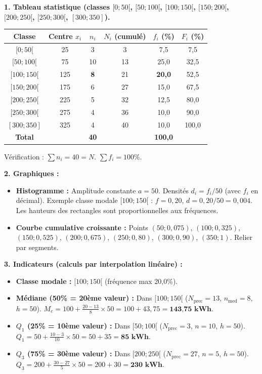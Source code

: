 \documentclass[11pt]{article}
\begin{document}
\begin{corrige}
\textbf{1. Tableau statistique (classes $[0;50[$, $[50;100[$, $[100;150[$, $[150;200[$, $[200;250[$, $[250;300[$, $[300;350]$).}
\begin{center}
\begin{tabular}{|c|c|c|c|c|c|}\hline
Classe & Centre $x_i$ & $n_i$ & $N_i$ (cumulé) & $f_i$ (\%) & $F_i$ (\%) \\ \hline
$[0 ; 50[$ & 25 & 3 & 3 & 7,5 & 7,5 \\
$[50 ; 100[$ & 75 & 10 & 13 & 25,0 & 32,5 \\
$[100 ; 150[$ & 125 & \textbf{8} & 21 & \textbf{20,0} & 52,5 \\
$[150 ; 200[$ & 175 & 6 & 27 & 15,0 & 67,5 \\
$[200 ; 250[$ & 225 & 5 & 32 & 12,5 & 80,0 \\
$[250 ; 300[$ & 275 & 4 & 36 & 10,0 & 90,0 \\
$[300 ; 350]$ & 325 & 4 & 40 & 10,0 & 100,0 \\ \hline
\textbf{Total} & & \textbf{40} & & \textbf{100,0} & \\ \hline
\end{tabular}
\end{center}
Vérification : $\sum n_i = 40 = N$. $\sum f_i = 100\%$.

\textbf{2. Graphiques :} 
\begin{itemize}
    \item \textbf{Histogramme :} Amplitude constante $a=50$. Densités $d_i = f_i / 50$ (avec $f_i$ en décimal). Exemple classe modale $[100;150[$ : $f=0,20$, $d = 0,20 / 50 = 0,004$. Les hauteurs des rectangles sont proportionnelles aux fréquences.
    \item \textbf{Courbe cumulative croissante :} Points $(50;0,075)$, $(100;0,325)$, $(150;0,525)$, $(200;0,675)$, $(250;0,80)$, $(300;0,90)$, $(350;1)$. Relier par segments.
\end{itemize}

\textbf{3. Indicateurs (calculs par interpolation linéaire) :}
\begin{itemize}
    \item \textbf{Classe modale :} $[100 ; 150[$ (fréquence max 20,0\%).
    \item \textbf{Médiane (50\% = 20ème valeur) :} Dans $[100 ; 150[$ ($N_{\text{prec}}=13$, $n_{\text{med}}=8$, $h=50$).
    $M_e = 100 + \frac{20 - 13}{8} \times 50 = 100 + 43,75 = \textbf{143,75 kWh}$.
    \item \textbf{$Q_1$ (25\% = 10ème valeur) :} Dans $[50 ; 100[$ ($N_{\text{prec}}=3$, $n=10$, $h=50$).
    $Q_1 = 50 + \frac{10 - 3}{10} \times 50 = 50 + 35 = \textbf{85 kWh}$.
    \item \textbf{$Q_3$ (75\% = 30ème valeur) :} Dans $[200 ; 250[$ ($N_{\text{prec}}=27$, $n=5$, $h=50$).
    $Q_3 = 200 + \frac{30 - 27}{5} \times 50 = 200 + 30 = \textbf{230 kWh}$.
\end{itemize}


\end{corrige}
\end{document}
